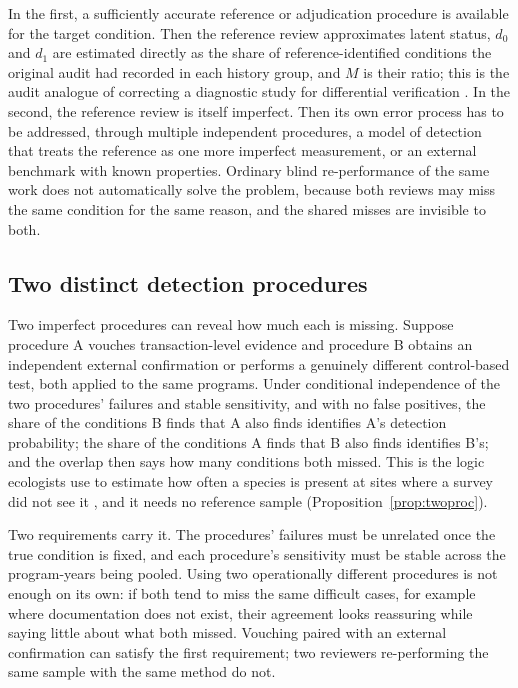 In the first, a sufficiently accurate reference or adjudication procedure is
available for the target condition. Then the reference review approximates
latent status, $d_0$ and $d_1$ are estimated directly as the share of
reference-identified conditions the original audit had recorded in each
history group, and $M$ is their ratio; this is the audit analogue of
correcting a diagnostic study for differential verification
\citep{degroot2011}. In the second, the reference review is itself imperfect.
Then its own error process has to be addressed, through multiple independent
procedures, a model of detection that treats the reference as one more
imperfect measurement, or an external benchmark with known properties.
Ordinary blind re-performance of the same work does not automatically solve
the problem, because both reviews may miss the same condition for the same
reason, and the shared misses are invisible to both.

\subsection{Two distinct detection procedures}

Two imperfect procedures can reveal how much each is missing. Suppose
procedure A vouches transaction-level evidence and procedure B obtains an
independent external confirmation or performs a genuinely different
control-based test, both applied to the same programs. Under conditional independence of the two procedures' failures and stable
sensitivity, and with no false positives, the share of the conditions B finds
that A also finds identifies A's detection probability; the share of the
conditions A finds that B also finds identifies B's; and the overlap then
says how many conditions both missed. This is the logic ecologists use to
estimate how often a species is present at sites where a survey did not see it
\citep{mackenzie2002}, and it needs no reference sample
(Proposition~\ref{prop:twoproc}).

Two requirements carry it. The procedures' failures must be unrelated once
the true condition is fixed, and each procedure's sensitivity must be stable
across the program-years being pooled. Using two operationally different
procedures is not enough on its own: if both tend to miss the same difficult
cases, for example where documentation does not exist, their agreement looks
reassuring while saying little about what both missed. Vouching paired with
an external confirmation can satisfy the first requirement; two reviewers
re-performing the same sample with the same method do not.

